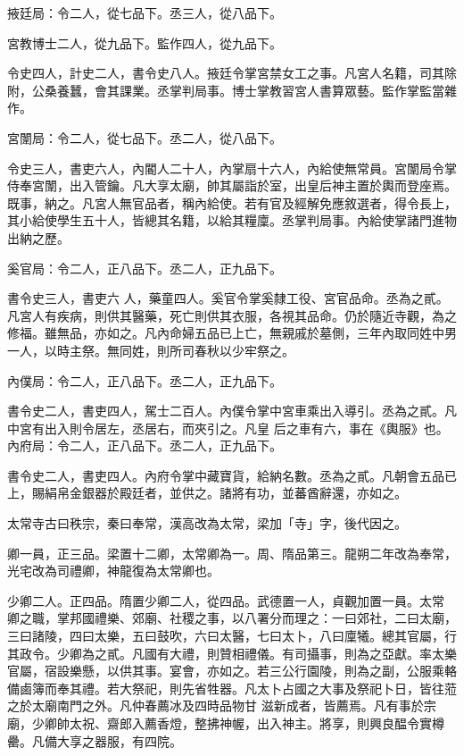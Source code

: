 \begin{pinyinscope}
 掖廷局：令二人，從七品下。丞三人，從八品下。



 宮教博士二人，從九品下。監作四人，從九品下。



 令史四人，計史二人，書令史八人。掖廷令掌宮禁女工之事。凡宮人名籍，司其除附，公桑養蠶，會其課業。丞掌判局事。博士掌教習宮人書算眾藝。監作掌監當雜作。



 宮闈局：令二人，從七品下。丞二人，從八品下。



 令史三人，書吏六人，內閽人二十人，內掌扇十六人，內給使無常員。宮闈局令掌侍奉宮闈，出入管鑰。凡大享太廟，帥其屬詣於室，出皇后神主置於輿而登座焉。既事，納之。凡宮人無官品者，稱內給使。若有官及經解免應敘選者，得令長上，其小給使學生五十人，皆總其名籍，以給其糧廩。丞掌判局事。內給使掌諸門進物出納之歷。



 奚官局：令二人，正八品下。丞二人，正九品下。



 書令史三人，書吏六
 人，藥童四人。奚官令掌奚隸工役、宮官品命。丞為之貳。凡宮人有疾病，則供其醫藥，死亡則供其衣服，各視其品命。仍於隨近寺觀，為之修福。雖無品，亦如之。凡內命婦五品已上亡，無親戚於墓側，三年內取同姓中男一人，以時主祭。無同姓，則所司春秋以少牢祭之。



 內僕局：令二人，正八品下。丞二人，正九品下。



 書令史二人，書吏四人，駕士二百人。內僕令掌中宮車乘出入導引。丞為之貳。凡中宮有出入則令居左，丞居右，而夾引之。凡皇
 后之車有六，事在《輿服》也。內府局：令二人，正八品下。丞二人，正九品下。



 書令史二人，書吏四人。內府令掌中藏寶貨，給納名數。丞為之貳。凡朝會五品已上，賜絹帛金銀器於殿廷者，並供之。諸將有功，並蕃酋辭還，亦如之。



 太常寺古曰秩宗，秦曰奉常，漢高改為太常，梁加「寺」字，後代因之。



 卿一員，正三品。梁置十二卿，太常卿為一。周、隋品第三。龍朔二年改為奉常，光宅改為司禮卿，神龍復為太常卿也。



 少卿二人。正四品。隋置少卿二人，從四品。武德置一人，貞觀加置一員。太常
 卿之職，掌邦國禮樂、郊廟、社稷之事，以八署分而理之：一曰郊社，二曰太廟，三曰諸陵，四曰太樂，五曰鼓吹，六曰太醫，七曰太卜，八曰廩犧。總其官屬，行其政令。少卿為之貳。凡國有大禮，則贊相禮儀。有司攝事，則為之亞獻。率太樂官屬，宿設樂懸，以供其事。宴會，亦如之。若三公行園陵，則為之副，公服乘輅備鹵簿而奉其禮。若大祭祀，則先省牲器。凡太卜占國之大事及祭祀卜日，皆往蒞之於太廟南門之外。凡仲春薦冰及四時品物甘
 滋新成者，皆薦焉。凡有事於宗廟，少卿帥太祝、齋郎入薦香燈，整拂神幄，出入神主。將享，則興良醖令實樽罍。凡備大享之器服，有四院。




\end{pinyinscope}
